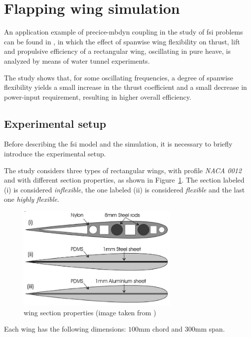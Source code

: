 
\section{Flapping wing simulation}

An application example of \acrshort{precice}-\acrshort{mbdyn} coupling in the study of \acrshort{fsi} problems can be found in \cite{heathcote2008effect}, in which the effect of spanwise wing flexibility on thrust, lift and propulsive efficiency of a rectangular wing, oscillating in pure heave, is analyzed by means of water tunnel experiments.

The study shows that, for some oscillating frequencies, a degree of spanwise flexibility yields a small
increase in the thrust coefficient and a small decrease in power-input requirement, resulting in higher overall efficiency.

\subsection{Experimental setup}

Before describing the \acrshort{fsi} model and the simulation, it is necessary to briefly introduce the experimental setup.

The study considers three types of rectangular wings, with profile \textit{NACA 0012} and with different section properties, as shown in Figure~\ref{fig:profiles0012}. The section labeled (i) is considered \textit{inflexible}, the one labeled (ii) is considered \textit{flexible} and the last one \textit{highly flexible}.

\begin{figure}[htbp!]
	\centering
	\includegraphics[width=0.7\textwidth]{images/profiles0012}
	\caption{wing section properties (image taken from \cite{heathcote2008effect})}
	\label{fig:profiles0012}
\end{figure}

Each wing has the following dimensions: $100$\si{mm} chord and $300$\si{mm} span.

